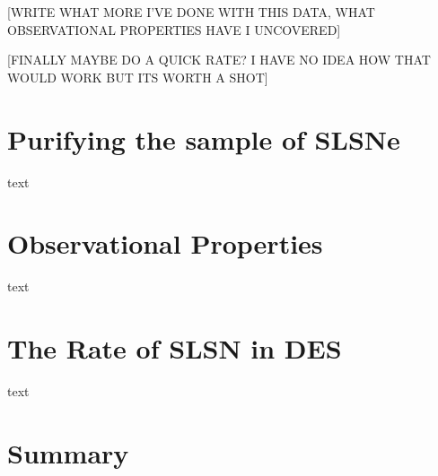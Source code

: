 [WRITE WHAT MORE I'VE DONE WITH THIS DATA, WHAT OBSERVATIONAL PROPERTIES HAVE I UNCOVERED]

[FINALLY MAYBE DO A QUICK RATE? I HAVE NO IDEA HOW THAT WOULD WORK BUT ITS WORTH A SHOT]

\section{Purifying the sample of SLSNe}
text

\section{Observational Properties}
text

\section{The Rate of SLSN in DES}
text

\section{Summary}
